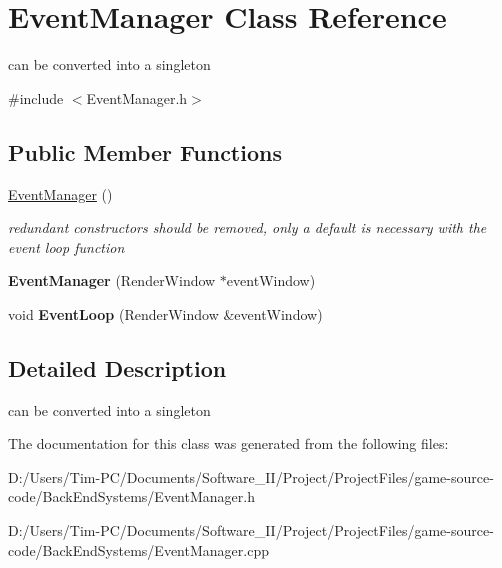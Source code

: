 \hypertarget{class_event_manager}{}\section{Event\+Manager Class Reference}
\label{class_event_manager}


can be converted into a singleton  




{\ttfamily \#include $<$Event\+Manager.\+h$>$}

\subsection*{Public Member Functions}
\begin{DoxyCompactItemize}
\item 
\mbox{\label{class_event_manager_a89099b22114f158b5c530edfea52371d}} 
\hyperlink{class_event_manager_a89099b22114f158b5c530edfea52371d}{Event\+Manager} ()
\begin{DoxyCompactList}\small\item\em redundant constructors should be removed, only a default is necessary with the event loop function \end{DoxyCompactList}\item 
\mbox{\label{class_event_manager_a8951d1cf3aabe678cd37c64317497519}} 
{\bfseries Event\+Manager} (Render\+Window $\ast$event\+Window)
\item 
\mbox{\label{class_event_manager_a3e90c3658f1fc88b45ba1b8fda4f2c10}} 
void {\bfseries Event\+Loop} (Render\+Window \&event\+Window)
\end{DoxyCompactItemize}


\subsection{Detailed Description}
can be converted into a singleton 

The documentation for this class was generated from the following files\+:\begin{DoxyCompactItemize}
\item 
D\+:/\+Users/\+Tim-\/\+P\+C/\+Documents/\+Software\+\_\+\+I\+I/\+Project/\+Project\+Files/game-\/source-\/code/\+Back\+End\+Systems/Event\+Manager.\+h\item 
D\+:/\+Users/\+Tim-\/\+P\+C/\+Documents/\+Software\+\_\+\+I\+I/\+Project/\+Project\+Files/game-\/source-\/code/\+Back\+End\+Systems/Event\+Manager.\+cpp\end{DoxyCompactItemize}
